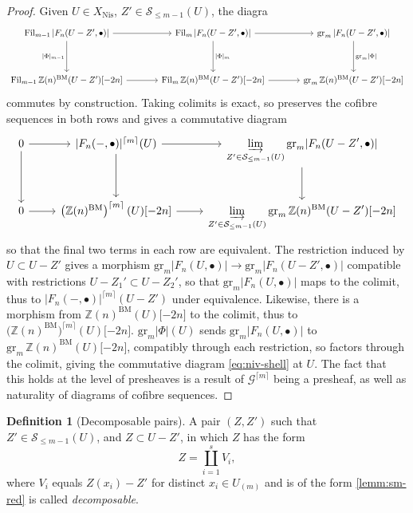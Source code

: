 \documentclass[11pt, twoside]{article}
\numberwithin{equation}{section}
\theoremstyle{definition}
\newtheorem{definition}[equation]{Definition}
\newcommand{\bb}[1]{\mathbb{#1}}
\newcommand{\colim}{\varinjlim}
\newcommand{\fil}{\mathrm{Fil}}
\newcommand{\gr}{\mathrm{gr}}
\newcommand{\bm}{\mathrm{BM}}
\newcommand{\nis}{\mathrm{Nis}}
\begin{document}
\begin{proof}
Given \(U \in X_\nis\), \(Z' \in \mathcal{S}_{\leq m - 1}(U)\), the diagra 
\[\begin{tikzcd} [row sep = huge, column sep = large]
\fil_{m - 1} \, |F_n(U - Z', \bullet)| \ar[d, "|\Phi|_{m - 1}", swap] \ar[r] & \fil_m \, |F_n(U - Z', \bullet)| \ar[d, "|\Phi|_m"] \ar[r] & \gr_m \, |F_n(U - Z', \bullet)| \ar[d, "\gr_m |\Phi|"]\\
\fil_{m - 1} \, \bb{Z}(n)^\bm(U - Z')\lbrack -2n \rbrack \ar[r] & \fil_m \, \bb{Z}(n)^\bm(U - Z')\lbrack -2n \rbrack \ar[r] & \gr_m \, \bb{Z}(n)^\bm(U - Z')\lbrack -2n \rbrack
\end{tikzcd}\]
commutes by construction.
Taking colimits is exact, so preserves the cofibre sequences in both rows and gives a commutative diagram 
\[\begin{tikzcd} [row sep = large]
 0 \ar[d] \ar[r] & \lvert F_n(-, \bullet)\rvert^{\lceil m \rceil}(U) \ar[d] \ar[r] & \displaystyle \colim_{Z' \in \mathcal{S}_{\leq m - 1}(U)} \gr_m |F_n(U - Z', \bullet)| \ar[d]\\
0 \ar[r] & \left(\bb{Z}(n)^\bm\right)^{\lceil m \rceil}(U)\lbrack -2n \rbrack \ar[r] & \displaystyle \colim_{Z' \in \mathcal{S}_{\leq m - 1}(U)} \gr_m \, \bb{Z}(n)^\bm(U - Z')\lbrack -2n \rbrack
\end{tikzcd}\]
so that the final two terms in each row are equivalent. The restriction induced by \(U \subset U - Z'\) gives a morphism \(\gr_m |F_n(U, \bullet)| \to \gr_m |F_n(U - Z', \bullet)|\) compatible with restrictions \(U - Z_1' \subset U - Z_2'\), so that \(\gr_m |F_n(U, \bullet)|\) maps to the colimit, thus to \(|F_n( -, \bullet)|^{\lceil m \rceil}(U - Z')\) under equivalence. Likewise, there is a morphism from \(\bb{Z}(n)^\bm(U) \lbrack -2n \rbrack\) to the colimit, thus to \(\big(\bb{Z}(n)^\bm\big)^{\lceil m \rceil}(U)\lbrack -2n \rbrack\). \(\gr_m|\Phi|(U)\) sends \(\gr_m|F_n(U, \bullet)|\) to \(\gr_m \, \bb{Z}(n)^\bm(U) \lbrack -2n \rbrack\), compatibly through each restriction, so factors through the colimit, giving the commutative diagram \ref{eq:niv-shell} at \(U\). The fact that this holds at the level of presheaves is a result of \(\mathcal{G}^{\lceil m \rceil}\) being a presheaf, as well as naturality of diagrams of cofibre sequences.
\end{proof}

\begin{definition}[Decomposable pairs]
A pair \((Z, Z')\) such that \(Z' \in \mathcal{S}_{\leq m - 1}(U)\), and \(Z \subset U - Z'\), in which \(Z\) has the form 
\[Z = \coprod_{i = 1}^s V_i,\]
where \(V_i\) equals \(Z(x_i) - Z'\) for distinct \(x_i \in U_{(m)}\) and is of the form \ref{lemm:sm-red} is called \emph{decomposable}. 
\end{definition}
\end{document}
